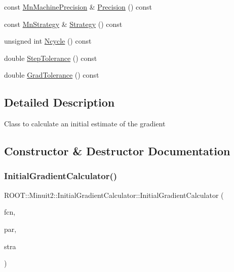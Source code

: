 \begin{DoxyCompactItemize}
\item 
const \mbox{\hyperlink{classROOT_1_1Minuit2_1_1MnMachinePrecision}{Mn\+Machine\+Precision}} \& \mbox{\hyperlink{classROOT_1_1Minuit2_1_1InitialGradientCalculator_a9f3821f6e60137b0cc9f25f85d96fbc5}{Precision}} () const
\item 
const \mbox{\hyperlink{classROOT_1_1Minuit2_1_1MnStrategy}{Mn\+Strategy}} \& \mbox{\hyperlink{classROOT_1_1Minuit2_1_1InitialGradientCalculator_ac8fb719893c5d2959ba9d784c8c2e887}{Strategy}} () const
\item 
unsigned int \mbox{\hyperlink{classROOT_1_1Minuit2_1_1InitialGradientCalculator_aef8f53869854439865a45497e011a41c}{Ncycle}} () const
\item 
double \mbox{\hyperlink{classROOT_1_1Minuit2_1_1InitialGradientCalculator_afc3c2d01aedfca1ca5ba35d231f9916d}{Step\+Tolerance}} () const
\item 
double \mbox{\hyperlink{classROOT_1_1Minuit2_1_1InitialGradientCalculator_aac6cfb88ce499207d304fdaf404b4f7d}{Grad\+Tolerance}} () const
\end{DoxyCompactItemize}


\subsection{Detailed Description}
Class to calculate an initial estimate of the gradient 

\subsection{Constructor \& Destructor Documentation}
\mbox{\label{classROOT_1_1Minuit2_1_1InitialGradientCalculator_a25d1c68548c1ada8fa395a3c684a61ec}} 
\subsubsection{\texorpdfstring{InitialGradientCalculator()}{InitialGradientCalculator()}\hspace{0.1cm}{\footnotesize\ttfamily [1/3]}}
{\footnotesize\ttfamily R\+O\+O\+T\+::\+Minuit2\+::\+Initial\+Gradient\+Calculator\+::\+Initial\+Gradient\+Calculator (\begin{DoxyParamCaption}\item[{const \mbox{\hyperlink{classROOT_1_1Minuit2_1_1MnFcn}{Mn\+Fcn}} \&}]{fcn,  }\item[{const \mbox{\hyperlink{classROOT_1_1Minuit2_1_1MnUserTransformation}{Mn\+User\+Transformation}} \&}]{par,  }\item[{const \mbox{\hyperlink{classROOT_1_1Minuit2_1_1MnStrategy}{Mn\+Strategy}} \&}]{stra }\end{DoxyParamCaption})\hspace{0.3cm}{\ttfamily [inline]}}


